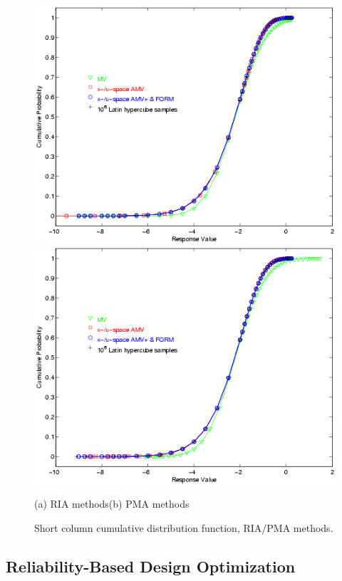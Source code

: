 \begin{figure}
\centering
\centerline{\includegraphics[scale=0.5]{images/short_col_cdf_ria}
            \includegraphics[scale=0.5]{images/short_col_cdf_pma}}
(a) RIA methods\hspace{2.75in}(b) PMA methods
\caption{Short column cumulative distribution function, RIA/PMA methods.}
\label{fig:short_col_cdf}
\end{figure}

\subsection{Reliability-Based Design Optimization}

